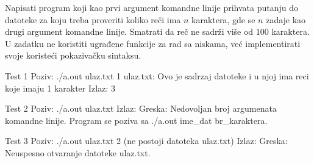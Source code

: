 \begin{Exercise}[label=306]
Napisati program koji kao prvi argument komandne linije prihvata
putanju do datoteke za koju treba proveriti koliko reči ima
$n$ karaktera, gde se $n$ zadaje kao drugi argument
komandne linije. Smatrati da reč ne sadrži više od $100$ karaktera.
U zadatku ne koristiti ugrađene funkcije za
rad sa niskama, već implementirati svoje koristeći
pokazivačku sintaksu.

\begin{maxitest}
\begin{test}{Test 1}
Poziv:    ./a.out ulaz.txt 1
ulaz.txt: Ovo je sadrzaj datoteke i u njoj ima reci koje imaju 
          1 karakter
Izlaz:    3
\end{test}
\end{maxitest}

\begin{maxitest}
\begin{test}{Test 2}
Poziv:  ./a.out ulaz.txt 
Izlaz:  Greska: Nedovoljan broj argumenata komandne linije.
        Program se poziva sa ./a.out ime_dat br_karaktera.
\end{test}
\end{maxitest}

\begin{maxitest}
\begin{test}{Test 3}
Poziv:    ./a.out ulaz.txt 2
(ne postoji datoteka ulaz.txt)
Izlaz: Greska: Neuspesno otvaranje datoteke ulaz.txt.
\end{test}
\end{maxitest}

\end{Exercise}
\begin{Answer}[ref=306]
\end{Answer}

